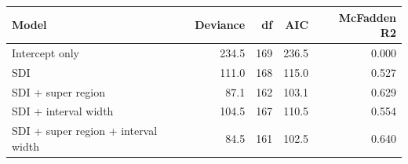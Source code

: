 \begin{tabular}{lrrrr}
\toprule
Model & Deviance & df & AIC & McFadden R2 \\
\midrule
Intercept only & 234.5 & 169 & 236.5 & 0.000 \\
SDI & 111.0 & 168 & 115.0 & 0.527 \\
SDI + super region &  87.1 & 162 & 103.1 & 0.629 \\
SDI + interval width & 104.5 & 167 & 110.5 & 0.554 \\
SDI + super region + interval width &  84.5 & 161 & 102.5 & 0.640 \\
\bottomrule
\end{tabular}
